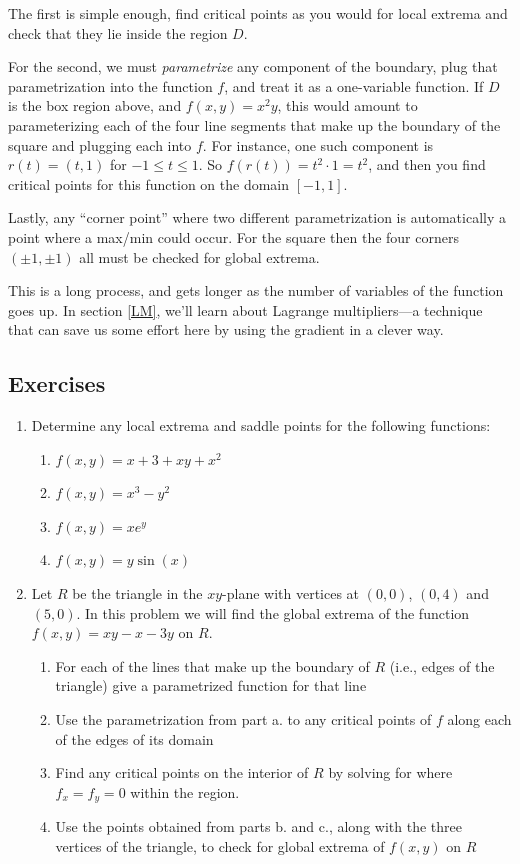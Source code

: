 \documentclass[12pt]{article}
\numberwithin{equation}{subsection}
\numberwithin{figure}{subsection}
\theoremstyle{note}
\begin{document}
{The first is simple enough, find critical points as you would for local extrema and check that they lie inside the region $D$. 

For the second, we must \textit{parametrize} any component of the boundary, plug that parametrization into the function $f$, and treat it as a one-variable function. If $D$ is the box region above, and $f(x,y)=x^2y$, this would amount to parameterizing each of the four line segments that make up the boundary of the square and plugging each into $f$. For instance, one such component is $r(t)=(t,1)$ for $-1\leq t\leq 1$. So $f(r(t))=t^2\cdot 1=t^2$, and then you find critical points for this function on the domain $[-1,1]$. 

Lastly, any ``corner point'' where two different parametrization is automatically a point where a max/min could occur. For the square then the four corners $(\pm 1, \pm 1)$ all must be checked for global extrema. 


This is a long process, and gets longer as the number of variables of the function goes up. In section \ref{LM}, we'll learn about Lagrange multipliers---a technique that can save us some effort here by using the gradient in a clever way.

\subsection{Exercises}
\begin{enumerate}[label=\arabic*.]
\item Determine any local extrema and saddle points for the following functions:

\begin{enumerate}
	\item $f(x,y)=x+3+xy+x^2$
	\item $f(x,y)=x^3-y^2$
	\item $f(x,y)=xe^y$
	\item $f(x,y)=y\sin(x)$
\end{enumerate}

\item Let $R$ be the triangle in the $xy$-plane with vertices at $(0,0)$, $(0,4)$ and $(5,0)$. In this problem we will find the global extrema of the function $f(x,y)=xy-x-3y$ on $R$.

\begin{enumerate}
	\item For each of the lines that make up the boundary of $R$ (i.e., edges of the triangle) give a parametrized function for that line
	\item Use the parametrization from part a. to any critical points of $f$ along each of the edges of its domain
	\item Find any critical points on the interior of $R$ by solving for where $f_x=f_y=0$ within the region. 
	\item Use the points obtained from parts b. and c., along with the three vertices of the triangle, to check for global extrema of $f(x,y)$ on $R$
\end{enumerate}


\end{enumerate}}
\end{document}
